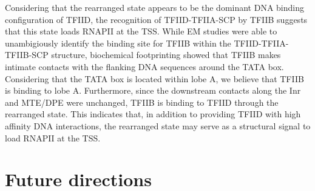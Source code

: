 \indent Considering that the rearranged state appears to be the dominant DNA binding configuration of TFIID, the recognition of TFIID-TFIIA-SCP by TFIIB suggests that this state loads RNAPII at the TSS. While EM studies were able to unambigiously identify the binding site for TFIIB within the TFIID-TFIIA-TFIIB-SCP structure, biochemical footprinting showed that TFIIB makes intimate contacts with the flanking DNA sequences around the TATA box. Considering that the TATA box is located within lobe A, we believe that TFIIB is binding to lobe A. Furthermore, since the downstream contacts along the Inr and MTE/DPE were unchanged, TFIIB is binding to TFIID through the rearranged state. This indicates that, in addition to providing TFIID with high affinity DNA interactions, the rearranged state may serve as a structural signal to load RNAPII at the TSS. \\  

\section{Future directions}

